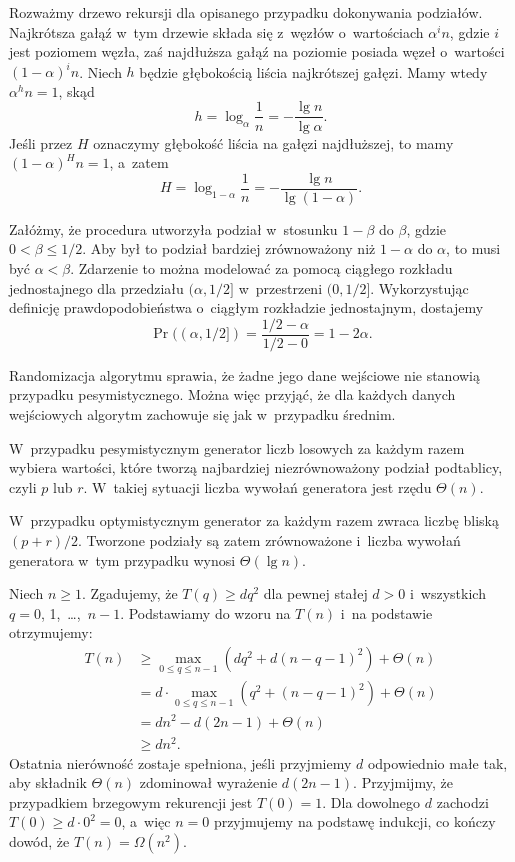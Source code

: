 \exercise %
Rozważmy drzewo rekursji dla opisanego przypadku dokonywania podziałów. Najkrótsza gałąź w~tym drzewie składa się z~węzłów o~wartościach $\alpha^in$, gdzie $i$ jest poziomem węzła, zaś najdłuższa gałąź na  poziomie posiada węzeł o~wartości $(1-\alpha)^in$. Niech $h$ będzie głębokością liścia najkrótszej gałęzi. Mamy wtedy $\alpha^hn=1$, skąd
\[
	h = \log_\alpha\frac{1}{n} = -\frac{\lg n}{\lg\alpha}.
\]
Jeśli przez $H$ oznaczymy głębokość liścia na gałęzi najdłuższej, to mamy $(1-\alpha)^Hn=1$, a~zatem
\[
	H = \log_{1-\alpha}\frac{1}{n} = -\frac{\lg n}{\lg(1-\alpha)}.
\]

\exercise %
Załóżmy, że procedura  utworzyła podział w~stosunku $1-\beta$ do $\beta$, gdzie $0<\beta\le1/2$. Aby był to podział bardziej zrównoważony niż $1-\alpha$ do $\alpha$, to musi być $\alpha<\beta$. Zdarzenie to można modelować za pomocą ciągłego rozkładu jednostajnego dla przedziału $(\alpha,1/2]$ w~przestrzeni $(0,1/2]$. Wykorzystując definicję prawdopodobieństwa o~ciągłym rozkładzie jednostajnym, dostajemy
\[
	\Pr((\alpha,1/2]) = \frac{1/2-\alpha}{1/2-0} = 1-2\alpha.
\]


\exercise %
Randomizacja algorytmu sprawia, że żadne jego dane wejściowe nie stanowią przypadku pesymistycznego. Można więc przyjąć, że dla każdych danych wejściowych algorytm zachowuje się jak w~przypadku średnim.

\exercise %
W~przypadku pesymistycznym generator liczb losowych za każdym razem wybiera wartości, które tworzą najbardziej niezrównoważony podział podtablicy, czyli $p$ lub $r$. W~takiej sytuacji liczba wywołań generatora jest rzędu $\Theta(n)$.

W~przypadku optymistycznym generator za każdym razem zwraca liczbę bliską $(p+r)/2$. Tworzone podziały są zatem zrównoważone i~liczba wywołań generatora w~tym przypadku wynosi $\Theta(\lg n)$.


\exercise %
Niech $n\ge1$. Zgadujemy, że $T(q)\ge dq^2$ dla pewnej stałej $d>0$ i~wszystkich $q=0$, 1,~\dots,~$n-1$. Podstawiamy do wzoru na $T(n)$ i~na podstawie  otrzymujemy:
\begin{align*}
	T(n) &\ge \max_{0\le q\le n-1}(dq^2+d(n-q-1)^2)+\Theta(n) \\
	&= d\cdot\!\!\!\max_{0\le q\le n-1}(q^2+(n-q-1)^2)+\Theta(n) \\
	&= dn^2-d(2n-1)+\Theta(n) \\
	&\ge dn^2.
\end{align*}
Ostatnia nierówność zostaje spełniona, jeśli przyjmiemy $d$ odpowiednio małe tak, aby składnik $\Theta(n)$ zdominował wyrażenie $d(2n-1)$. Przyjmijmy, że przypadkiem brzegowym rekurencji jest $T(0)=1$. Dla dowolnego $d$ zachodzi $T(0)\ge d\cdot0^2=0$, a~więc $n=0$ przyjmujemy na podstawę indukcji, co kończy dowód, że $T(n)=\Omega(n^2)$.

